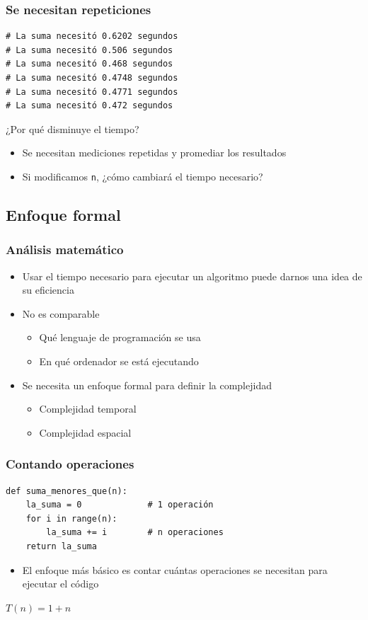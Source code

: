 \documentclass[11pt]{beamer}
\begin{document}
	\begin{frame}[fragile]\frametitle{Se necesitan repeticiones}
	\begin{lstlisting}
# La suma necesitó 0.6202 segundos
# La suma necesitó 0.506 segundos
# La suma necesitó 0.468 segundos
# La suma necesitó 0.4748 segundos
# La suma necesitó 0.4771 segundos
# La suma necesitó 0.472 segundos
\end{lstlisting}
	\begin{block}{}
	\centering ¿Por qué disminuye el tiempo?
	\end{block}
	\pause
	\begin{itemize}
	\item Se necesitan mediciones repetidas y promediar los resultados
	\item Si modificamos \texttt{n}, ¿cómo cambiará el tiempo necesario?
	\end{itemize}
	\end{frame}

	\subsection{Enfoque formal}

	\begin{frame}\frametitle{Análisis matemático}
	\begin{itemize}
	\item Usar el tiempo necesario para ejecutar un algoritmo puede darnos una idea de su eficiencia
	\pause
	\item No es comparable 
	\begin{itemize}
		\item Qué lenguaje de programación se usa
		\item En qué ordenador se está ejecutando
	\end{itemize}
	\pause
	\item Se necesita un enfoque formal para definir la complejidad
	\begin{itemize}
		\item Complejidad temporal
		\item Complejidad espacial
	\end{itemize}
	\end{itemize}
	\end{frame}

	\begin{frame}[fragile]\frametitle{Contando operaciones}
	\begin{lstlisting}
def suma_menores_que(n):
    la_suma = 0				# 1 operación
    for i in range(n):
        la_suma += i		# n operaciones
    return la_suma
\end{lstlisting}
	\begin{itemize}
	\item El enfoque más básico es contar cuántas operaciones se necesitan para ejecutar el código
	\end{itemize}
	\pause
	\begin{block}{}
	\centering$T(n) = 1 + n$
	\end{block}
	\end{frame}
\end{document}
